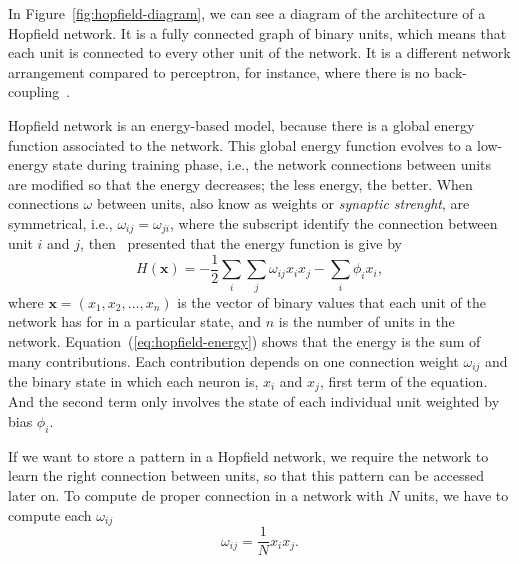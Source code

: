 In Figure~\ref{fig:hopfield-diagram}, we can see a diagram of the architecture of a Hopfield network.
It is a fully connected graph of binary units, which means that each unit is connected to every other unit of the network.
It is a different network arrangement compared to perceptron, for instance, where there is no back-coupling~\cite{bib:hopfield1982}.


Hopfield network is an energy-based model, because there is a global energy function associated to the network.
This global energy function evolves to a low-energy state during training phase, i.e., the network connections between units are modified so that the energy decreases; the less energy, the better.
When connections $\omega$ between units, also know as weights or \textit{synaptic strenght}, are symmetrical, i.e., $\omega_{ij} = \omega_{ji}$, where the subscript identify the connection between unit $i$ and $j$, then~ presented that the energy function is give by
\begin{equation}\label{eq:hopfield-energy}
  H(\mathbf{x}) = -\frac{1}{2}\sum_{i} \sum_{j} \omega_{ij} x_{i} x_{j} - \sum_{i} \phi_{i} x_{i},
\end{equation}
where $\mathbf{x} = (x_{1}, x_{2}, \dots, x_{n})$ is the vector of binary values that each unit of the network has for in a particular state, and $n$ is the number of units in the network.
Equation~(\ref{eq:hopfield-energy}) shows that the energy is the sum of many contributions.
Each contribution depends on one connection weight $\omega_{ij}$ and the binary state in which each neuron is, $x_{i}$ and $x_{j}$, first term of the equation.
And the second term only involves the state of each individual unit weighted by bias $\phi_{i}$.

If we want to store a pattern in a Hopfield network, we require the network to learn the right connection between units, so that this pattern can be accessed later on. To compute de proper connection in a network with $N$ units, we have to compute each $\omega_{ij}$
\begin{equation}
  \label{eq:hopfield-learn}
  \omega_{ij} = \frac{1}{N} x_{i} x_{j}.
\end{equation}

